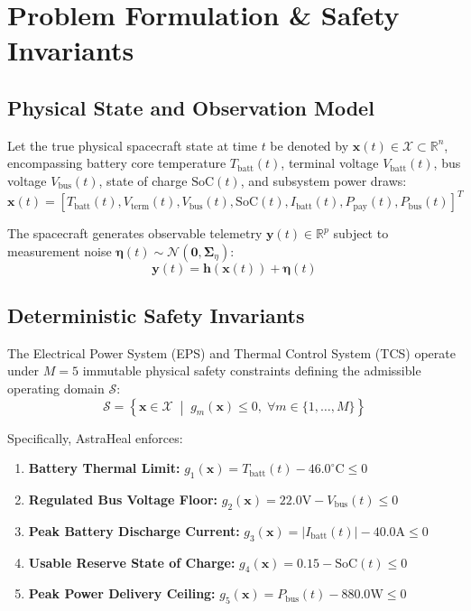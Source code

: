 \documentclass[conference]{IEEEtran}
\begin{document}
\section{Problem Formulation \& Safety Invariants}

\subsection{Physical State and Observation Model}
Let the true physical spacecraft state at time $t$ be denoted by $\mathbf{x}(t) \in \mathcal{X} \subset \mathbb{R}^n$, encompassing battery core temperature $T_{\text{batt}}(t)$, terminal voltage $V_{\text{batt}}(t)$, bus voltage $V_{\text{bus}}(t)$, state of charge $\text{SoC}(t)$, and subsystem power draws:
\begin{equation}
\mathbf{x}(t) = \left[ T_{\text{batt}}(t), V_{\text{term}}(t), V_{\text{bus}}(t), \text{SoC}(t), I_{\text{batt}}(t), P_{\text{pay}}(t), P_{\text{bus}}(t) \right]^T
\end{equation}

The spacecraft generates observable telemetry $\mathbf{y}(t) \in \mathbb{R}^p$ subject to measurement noise $\boldsymbol{\eta}(t) \sim \mathcal{N}(\mathbf{0}, \boldsymbol{\Sigma}_{\eta})$:
\begin{equation}
\mathbf{y}(t) = \mathbf{h}(\mathbf{x}(t)) + \boldsymbol{\eta}(t)
\end{equation}

\subsection{Deterministic Safety Invariants}
The Electrical Power System (EPS) and Thermal Control System (TCS) operate under $M=5$ immutable physical safety constraints defining the admissible operating domain $\mathcal{S}$:
\begin{equation}
\mathcal{S} = \left\{ \mathbf{x} \in \mathcal{X} \;\middle|\; g_m(\mathbf{x}) \le 0, \;\forall m \in \{1, \dots, M\} \right\}
\end{equation}

Specifically, AstraHeal enforces:
\begin{enumerate}
    \item \textbf{Battery Thermal Limit:} $g_1(\mathbf{x}) = T_{\text{batt}}(t) - 46.0^\circ\text{C} \le 0$
    \item \textbf{Regulated Bus Voltage Floor:} $g_2(\mathbf{x}) = 22.0\text{V} - V_{\text{bus}}(t) \le 0$
    \item \textbf{Peak Battery Discharge Current:} $g_3(\mathbf{x}) = |I_{\text{batt}}(t)| - 40.0\text{A} \le 0$
    \item \textbf{Usable Reserve State of Charge:} $g_4(\mathbf{x}) = 0.15 - \text{SoC}(t) \le 0$
    \item \textbf{Peak Power Delivery Ceiling:} $g_5(\mathbf{x}) = P_{\text{bus}}(t) - 880.0\text{W} \le 0$
\end{enumerate}
\end{document}
